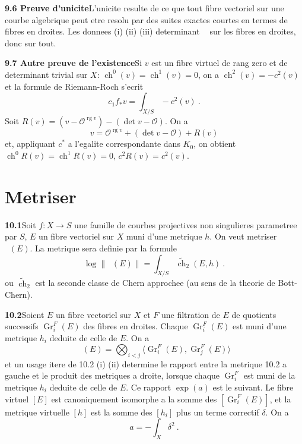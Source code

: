 \documentclass[12pt,a4paper]{article}
\theoremstyle{plain}
\theoremstyle{definition}
\theoremstyle{remark}
\DeclareMathOperator{\ch}{ch}
\DeclareMathOperator{\Gr}{Gr}
\newcommand{\calO}{\mathcal{O}}
\DeclareMathOperator{\rg}{rg}
\DeclareMathOperator{\ICtwo}{IC_2}
\begin{document}
\medskip
\noindent\textbf{9.6 Preuve d'unicite}\quad L'unicite resulte de ce que tout fibre vectoriel sur une courbe algebrique peut etre resolu par des suites exactes courtes en termes de fibres en droites. Les donnees (i) (ii) (iii) determinant $\ICtwo$ sur les fibres en droites, donc sur tout.

\medskip
\noindent\textbf{9.7 Autre preuve de l'existence}\quad Si $v$ est un fibre virtuel de rang zero et de determinant trivial sur $X$: $\ch^0(v) = \ch^1(v) = 0$, on a $\ch^2(v) = -c^2(v)$ et la formule de Riemann-Roch s'ecrit
\[
c_1 f_* v = \int_{X/S} -c^2(v) \ .
\]
Soit $R(v) = (v - \calO^{\rg v}) - (\det v - \calO)$. On a
\begin{equation}
\label{eq:9.7.1}
v = \calO^{\rg v} + (\det v - \calO) + R(v)
\end{equation}
et, appliquant $c^*$ a l'egalite correspondante dans $K_0$, on obtient $\ch^0 R(v) = \ch^1 R(v) = 0$, $c^2 R(v) = c^2(v)$.


\section{Metriser $\ICtwo$}

\noindent\textbf{10.1}\quad Soit $f: X \to S$ une famille de courbes projectives non singulieres parametree par $S$, $E$ un fibre vectoriel sur $X$ muni d'une metrique $h$. On veut metriser $\ICtwo(E)$. La metrique sera definie par la formule
\begin{equation}
\label{eq:10.1.1}
\log \|\ICtwo(E)\| = \int_{X/S} \widetilde{\ch}_2(E, h) \ .
\end{equation}
ou $\widetilde{\ch}_2$ est la seconde classe de Chern approchee (au sens de la theorie de Bott-Chern).

\medskip
\noindent\textbf{10.2}\quad Soient $E$ un fibre vectoriel sur $X$ et $F$ une filtration de $E$ de quotients successifs $\Gr_i^F(E)$ des fibres en droites. Chaque $\Gr_i^F(E)$ est muni d'une metrique $h_i$ deduite de celle de $E$. On a
\begin{equation}
\label{eq:10.2.1}
\ICtwo(E) = \bigotimes_{i < j} \langle \Gr_i^F(E), \Gr_j^F(E) \rangle
\end{equation}
et un usage itere de 10.2 (i) (ii) determine le rapport entre la metrique 10.2 a gauche et le produit des metriques a droite, lorsque chaque $\Gr_i^F$ est muni de la metrique $h_i$ deduite de celle de $E$. Ce rapport $\exp(a)$ est le suivant. Le fibre virtuel $[E]$ est canoniquement isomorphe a la somme des $[\Gr_i^F(E)]$, et la metrique virtuelle $[h]$ est la somme des $[h_i]$ plus un terme correctif $\delta$. On a
\begin{equation}
\label{eq:10.2.2}
a = -\int_X \delta^2 \ .
\end{equation}
\end{document}
